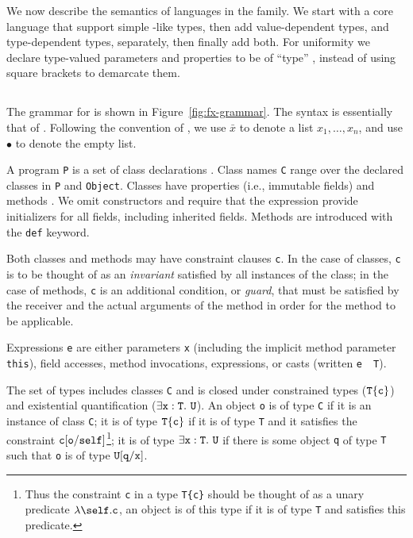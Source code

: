 \newcommand{\constraint}{{\tt constraint}}
\newcommand\cj[2]{{#1} \vdash {#2}~\constraint}
\newcommand\cjj[3]{{#1} \vdash {#2}~\constraint, {#3}~\constraint}
\newcommand\wj[2]{{#1} \vdash {#2}~\type}
\newcommand\tj[3]{{#1} \vdash {#2} \ty {#3}}
\newcommand\stj[3]{{#1} \vdash {#2} \subtype {#3}}

We now describe the semantics of languages in the \FX{} family.
We start with a core \FXZ{} language that support simple
\FJ-like types, then add value-dependent types, and type-dependent
types, separately, then finally add both. For uniformity we declare type-valued parameters and properties to be of ``type'' \type, instead of using square brackets to demarcate them.

\subsection{\FXZ}

The grammar for \FXZ{} is shown in Figure~\ref{fig:fx-grammar}.
The syntax is essentially that of \FJ{}.
Following the convention of \FJ{}, we use $\bar{x}$ to denote a
list $x_1, \dots, x_n$, and use $\bullet$ to denote the empty
list.

A program {\tt P} is a set of class declarations .
Class names {\tt C} range over the declared classes in {\tt P} 
and {\tt Object}.
Classes have
properties (i.e., immutable fields)  and methods .  We omit constructors
and require that the \new{} expression provide initializers
for all fields, including inherited fields. 
Methods are introduced with the {\tt def} keyword.

Both classes and methods may have constraint clauses
{\tt c}.  In the case of classes, {\tt c} is to be thought of as an
{\em invariant} satisfied by all instances of the class; in the case of
methods, {\tt c} is an additional condition, or {\em guard},
that must be satisfied by
the receiver 
and the actual arguments of the method in order for the method to
be applicable.

Expressions {\tt e} are either parameters {\tt x} (including the implicit
method parameter {\tt this}), field accesses, method invocations, \new{}
expressions, or casts (written {\tt e}~\as~{\tt T}).

The set of types includes classes {\tt C} and is closed under
constrained types ($\tt T\{c\}$) and existential
quantification ($\exists \tt x:T.~U$).
An object {\tt o} is of type {\tt C} if it is an instance of class {\tt C}; it is of type $\tt
T\{c\}$ if it is of type {\tt T} and it satisfies the constraint $\tt
c[o/self]$\footnote{Thus the constraint {\tt c} in a type {\tt T\{c\}}
should be thought of as a unary predicate $\lambda\self.{\tt c}$, an
object is of this type if it is of type {\tt T} and satisfies this
predicate.}; it is of type $\exists \tt x:T.~U$
if there is some object {\tt q}
of type {\tt T} such that {\tt o} is of type
$\tt U[q/x]$.

